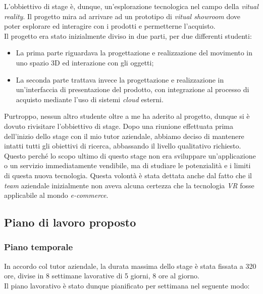 L'obbiettivo di stage è, dunque, un'esplorazione tecnologica nel campo della \textit{vitual reality}. Il progetto mira ad arrivare ad un prototipo di \textit{vitual showroom} dove poter esplorare ed interagire con i prodotti e permetterne l'acquisto. \\
Il progetto era stato inizialmente diviso in due parti, per due differenti studenti:
\begin{itemize}
	\item La prima parte riguardava la progettazione e realizzazione del movimento in uno spazio 3D ed interazione con gli oggetti;
	\item La seconda parte trattava invece la progettazione e realizzazione in un'interfaccia di presentazione del prodotto, con integrazione al processo di acquisto mediante l'uso di sistemi \textit{cloud} esterni.
\end{itemize}
Purtroppo, nessun altro studente oltre a me ha aderito al progetto, dunque si è dovuto rivisitare l'obbiettivo di stage. Dopo una riunione effettuata prima dell'inizio dello stage con il mio tutor aziendale, abbiamo deciso di mantenere intatti tutti gli obiettivi di ricerca, abbassando il livello qualitativo richiesto. Questo perché lo scopo ultimo di questo stage non era sviluppare un'applicazione o un servizio immediatamente vendibile, ma di studiare le potenzialità e i limiti di questa nuova tecnologia. Questa volontà è stata dettata anche dal fatto che il \textit{team} aziendale inizialmente non aveva alcuna certezza che la tecnologia \textit{VR} fosse applicabile al mondo \textit{e-commerce}.

\subsection{Piano di lavoro proposto}

\subsubsection{Piano temporale}

In accordo col tutor aziendale, la durata massima dello stage è stata fissata a 320 ore, divise in 8 settimane lavorative di 5 giorni, 8 ore al giorno. \\
Il piano lavorativo è stato dunque pianificato per settimana nel seguente modo:


